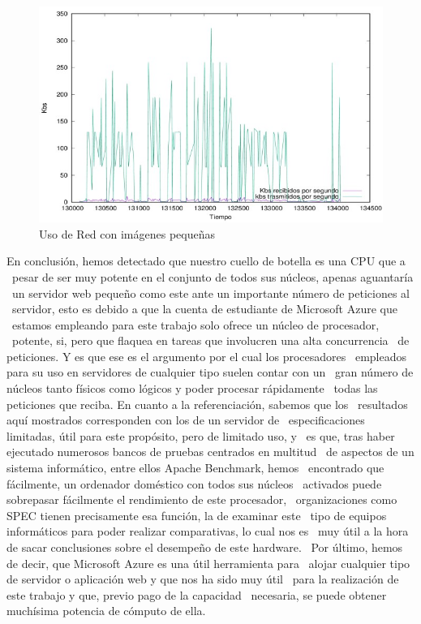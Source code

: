 \documentclass[11pt,twoside,a4paper]{book}
\renewcommand{\baselinestretch}{1.2}
\begin{document}
\begin{figure}[H]
   \includegraphics[width=\textwidth]{redpequenos.jpg}
   \caption{Uso de Red con imágenes pequeñas}
   \label{red3}
\end{figure}

En conclusión, hemos detectado que nuestro cuello de botella es una CPU que a \
pesar de ser muy potente en el conjunto de todos sus núcleos, apenas aguantaría \
un servidor web pequeño como este ante un importante número de peticiones al \
servidor, esto es debido a que la cuenta de estudiante de Microsoft Azure que \
estamos empleando para este trabajo solo ofrece un núcleo de procesador, \
potente, si, pero que flaquea en tareas que involucren una alta concurrencia \
de peticiones. Y es que ese es el argumento por el cual los procesadores \
empleados para su uso en servidores de cualquier tipo suelen contar con un \
gran número de núcleos tanto físicos como lógicos y poder procesar rápidamente \
todas las peticiones que reciba. En cuanto a la referenciación, sabemos que los \
resultados aquí mostrados corresponden con los de un servidor de \
especificaciones limitadas, útil para este propósito, pero de limitado uso, y \
es que, tras haber ejecutado numerosos bancos de pruebas centrados en multitud \
de aspectos de un sistema informático, entre ellos Apache Benchmark, hemos \
encontrado que fácilmente, un ordenador doméstico con todos sus núcleos \
activados puede sobrepasar fácilmente el rendimiento de este procesador, \
organizaciones como SPEC tienen precisamente esa función, la de examinar este \
tipo de equipos informáticos para poder realizar comparativas, lo cual nos es \
muy útil a la hora de sacar conclusiones sobre el desempeño de este hardware. \
Por último, hemos de decir, que Microsoft Azure es una útil herramienta para \
alojar cualquier tipo de servidor o aplicación web y que nos ha sido muy útil \
para la realización de este trabajo y que, previo pago de la capacidad \
necesaria, se puede obtener muchísima potencia de cómputo de ella.



\appendix

\renewcommand{\baselinestretch}{1.2}



\cite{KM2000}
\end{document}
